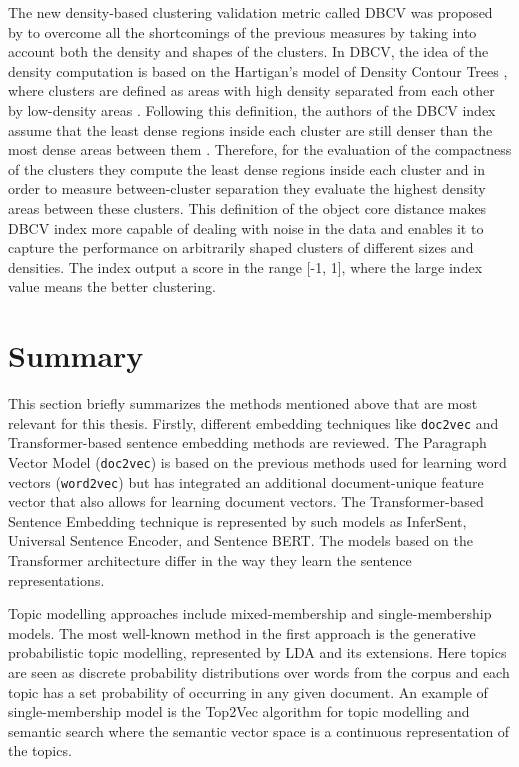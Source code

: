 \documentclass[fontsize=12pt,a4paper,twoside,openany]{scrbook}
\begin{document}
The new density-based clustering validation metric called DBCV was proposed by \textcite{Moulavi14} to overcome all the shortcomings of the previous measures by taking into account both the density and shapes of the clusters. In DBCV, the idea of the density computation is based on the Hartigan’s model of Density Contour Trees \parencite{Hartigan75}, where clusters are defined as areas with high density separated from each other by low-density areas \parencite{Moulavi14, Hartigan75}. Following this definition, the authors of the DBCV index assume that the least dense regions inside each cluster are still denser than the most dense areas between them \parencite{Moulavi14}. Therefore, for the evaluation of the compactness of the clusters they compute the least dense regions inside each cluster and in order to measure between-cluster separation they evaluate the highest density areas between these clusters. This definition of the object core distance makes DBCV index more capable of dealing with noise in the data and enables it to capture the performance on arbitrarily shaped clusters of different sizes and densities. The index output a score in the range [-1, 1], where the large index value means the better clustering.

\section{Summary}
This section briefly summarizes the methods mentioned above that are most relevant for this thesis. Firstly, different embedding techniques like \verb|doc2vec| and Transformer-based sentence embedding methods are reviewed. The Paragraph Vector Model (\verb|doc2vec|) is based on the previous methods used for learning word vectors (\verb|word2vec|) but has integrated an additional document-unique feature vector that also allows for learning document vectors. The Transformer-based Sentence Embedding technique is represented by such models as InferSent, Universal Sentence Encoder, and Sentence BERT. The models based on the Transformer architecture differ in the way they learn the sentence representations.

Topic modelling approaches include mixed-membership and single-membership models. The most well-known method in the first approach is the generative probabilistic topic modelling, represented by LDA and its extensions. Here topics are seen as discrete probability distributions over words from the corpus and each topic has a set probability of occurring in any given document. An example of single-membership model is the Top2Vec algorithm for topic modelling and semantic search where the semantic vector space is a continuous representation of the topics.
\end{document}

